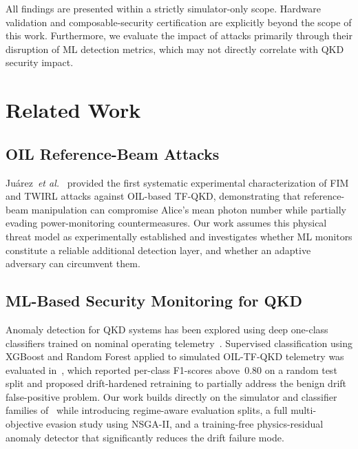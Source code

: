 \documentclass[journal,twocolumn]{IEEEtran}
\begin{document}
All findings are presented within a strictly simulator-only scope. Hardware
validation and composable-security certification are explicitly beyond the scope of this work. 
Furthermore, we evaluate the impact of attacks primarily through their disruption of ML detection 
metrics, which may not directly correlate with QKD security impact.

\section{Related Work}
\label{sec:related}

\subsection{OIL Reference-Beam Attacks}

Juárez~\emph{et al.}~\cite{juarez2026} provided the first systematic experimental
characterization of FIM and TWIRL attacks against OIL-based TF-QKD, demonstrating
that reference-beam manipulation can compromise Alice's mean photon number while
partially evading power-monitoring countermeasures. Our work assumes this physical
threat model as experimentally established and investigates whether ML monitors
constitute a reliable additional detection layer, and whether an adaptive adversary
can circumvent them.

\subsection{ML-Based Security Monitoring for QKD}

Anomaly detection for QKD systems has been explored using deep one-class
classifiers trained on nominal operating telemetry~\cite{anomaly2021}. Supervised
classification using XGBoost and Random Forest applied to simulated OIL-TF-QKD
telemetry was evaluated in~\cite{basepaper}, which reported per-class F1-scores
above~$0.80$ on a random test split and proposed drift-hardened retraining to
partially address the benign drift false-positive problem. Our work builds directly
on the simulator and classifier families of~\cite{basepaper} while introducing
regime-aware evaluation splits, a full multi-objective evasion study using NSGA-II, 
and a training-free physics-residual anomaly detector that significantly reduces the 
drift failure mode.
\end{document}
